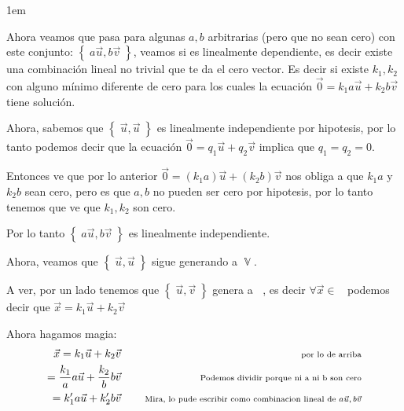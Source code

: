 \documentclass[12pt, fleqn]{report}                             %
\newenvironment{SmallIndentation}[1][0.75em]                    %
        {\begin{adjustwidth}{#1}{}\begin{footnotesize}}             %
        {\end{footnotesize}\end{adjustwidth}}                       %
\DeclareMathOperator \Space {\quad}                             %
\newcommand \Remember[1]{\Space\text{\scriptsize{#1}}}          %
\theoremstyle{break}                                            %
\DeclareMathOperator \GenericField {\mathbb{F}}                 %
\DeclareMathOperator \VectorSet    {\mathbb{V}}                 %
\DeclareMathOperator \VectorSpace  {\VectorSet_{\GenericField}} %
\newcommand{\Set}[1]    {\left\{ \; #1 \; \right\}}             %
\begin{document}
\begin{itemize}
\begin{SmallIndentation}[1em]
                            Ahora veamos que pasa para algunas $a, b$ arbitrarias (pero que no sean cero) con este conjunto: 
                            $\Set{a \vec u, b \vec v}$, veamos si es linealmente dependiente, es decir existe una combinación lineal
                            no trivial que te da el cero vector.
                            Es decir si existe $k_1, k_2$ con alguno mínimo diferente de cero para los cuales la ecuación 
                            $\vec 0 = k_1 a \vec u + k_2 b \vec v$  tiene solución.

                            Ahora, sabemos que $\Set{\vec u, \vec u}$ es linealmente independiente por hipotesis, por lo tanto
                            podemos decir que la ecuación $\vec 0 = q_1 \vec u + q_2 \vec v$ implica que $q_1 = q_2 = 0$.

                            Entonces ve que por lo anterior $\vec 0 = (k_1 a) \vec u + (k_2 b) \vec v$ nos obliga a que $k_1a$ y $k_2b$ 
                            sean cero, pero es que $a, b$ no pueden ser cero por hipotesis, por lo tanto tenemos que ve que $k_1, k_2$ son cero.

                            Por lo tanto $\Set{a \vec u, b \vec v}$ es linealmente independiente.

                            Ahora, veamos que $\Set{\vec u, \vec u}$ sigue generando a $\VectorSet$.

                            A ver, por un lado tenemos que $\Set{\vec u, \vec v}$ genera a $\VectorSpace$, es decir
                            $\forall \vec x \in \VectorSpace$ podemos decir que $\vec x = k_1 \vec u + k_2 \vec v$

                            Ahora hagamos magia:
                            \begin{align*}
                                \vec x  
                                    = k_1 \vec u + k_2 \vec v  
                                        &&\Remember{ por lo de arriba}                                                      \\
                                    = \frac{k_1}{a} a \vec u + \frac{k_2}{b} b\vec v
                                        &&\Remember{Podemos dividir porque ni a ni b son cero}                              \\
                                    = k_1' a \vec u + k_2' b\vec v
                                        &&\Remember{Mira, lo pude escribir como combinacion lineal de $a\vec u, b \vec v$}   
                            \end{align*}


\end{SmallIndentation}
\end{itemize}
\end{document}
